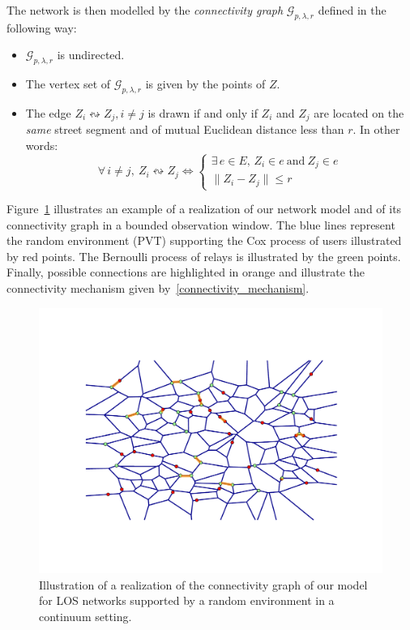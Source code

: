 \documentclass[10pt,a4paper]{amsart}
\theoremstyle{exampstyle}
\theoremstyle{exampnotations}
\begin{document}
The network is then modelled by the \emph{connectivity graph} $\mathcal{G}_{p,\lambda,r}$ defined in the following way:
\begin{itemize}
\item $\mathcal{G}_{p,\lambda,r}$ is undirected.
\item The vertex set of $\mathcal{G}_{p,\lambda,r}$ is given by the points of $Z$.
\item The edge $Z_{i} \leftrightsquigarrow Z_{j}, i \neq j$ is drawn if and only if $Z_{i}$ and $Z_{j}$ are located on the \emph{same} street segment and of mutual Euclidean distance less than $r$. In other words:
\begin{equation}
\label{connectivity_mechanism}
\forall \, i \neq j, \: Z_{i} \leftrightsquigarrow Z_{j} \Leftrightarrow 
\left\{
\begin{array}{l}
\exists \, e \in E, \, Z_{i} \in e  \  \text{and} \  Z_{j} \in e \\
\lVert Z_{i} - Z_{j} \rVert \leq r
\end{array}
\right.
\end{equation}
\end{itemize}
\indent Figure~\ref{fig:Network} illustrates an example of a realization of our network model and of its connectivity graph in a bounded observation window. The blue lines represent the random environment (PVT) supporting the Cox process of users illustrated by red points. The Bernoulli process of relays is illustrated by the green points. Finally, possible connections are highlighted in orange and illustrate the connectivity mechanism given by~\eqref{connectivity_mechanism}.
\begin{figure}[h!]
\centering
    \includegraphics[width=0.6\linewidth]{Network.pdf}
    \caption{Illustration of a realization of the connectivity graph of our model for LOS networks supported by a random environment in a continuum setting.}
    \label{fig:Network}
\end{figure}
\end{document}

